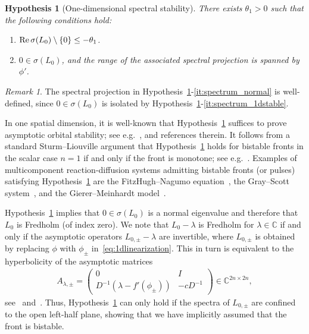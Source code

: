 \documentclass[12pt,oneside,a4paper,reqno]{amsart}
\numberwithin{equation}{section}
\newtheorem{hypothesis}{Hypothesis}
\theoremstyle{definition}
\theoremstyle{remark}
\newtheorem{remark}[theorem]{Remark}
\newcommand{\bbC}{{\mathbb C}}
\DeclareMathOperator{\Real}{Re}
\DeclarePairedDelimiter{\cur}{\{}{\}}
\begin{document}
\begin{hypothesis}[One-dimensional spectral stability]
    \label{hyp:spectrum_1d}
    There exists $\theta_1 > 0$ such that the following conditions hold:
	\begin{enumerate}[label=(\roman*)]
        \item \label{it:spectrum_1dstable} $\Real \sigma(L_0)\setminus \cur{0} \leq -\theta_1$.
        \item \label{it:spectrum_normal} $0 \in \sigma(L_0)$, and the range of the associated spectral projection is spanned by $\phi'$.
	\end{enumerate}
\end{hypothesis}
\begin{remark}
    The spectral projection in Hypothesis~\ref{hyp:spectrum_1d}-\ref{it:spectrum_normal} is well-defined, since $0 \in \sigma(L_0)$ is isolated by Hypothesis~\ref{hyp:spectrum_1d}-\ref{it:spectrum_1dstable}.
\end{remark}

In one spatial dimension, it is well-known that Hypothesis~\ref{hyp:spectrum_1d} suffices to prove asymptotic orbital stability; see e.g.~\cite{Henry_geometric_1981,Kapitula_spectral_2013,Sattinger_stability_1976}, and references therein. It follows from a standard Sturm--Liouville argument that Hypothesis~\ref{hyp:spectrum_1d} holds for bistable fronts in the scalar case $n=1$ if and only if the front is monotone; see e.g.~\cite[Chapter~2]{Kapitula_spectral_2013}. Examples of multicomponent reaction-diffusion systems admitting bistable fronts (or pulses) satisfying Hypothesis~\ref{hyp:spectrum_1d} are the FitzHugh--Nagumo equation~\cite{cornwell_existence_2018}, the Gray--Scott system~\cite{doelman_stability_2002}, and the Gierer--Meinhardt model~\cite{doelman_large_2001}.

Hypothesis~\ref{hyp:spectrum_1d} implies that $0 \in \sigma(L_0)$ is a normal eigenvalue and therefore that $L_0$ is Fredholm (of index zero).
We note that $L_0 - \lambda$ is Fredholm for $\lambda \in \bbC$ if and only if the asymptotic operators $L_{0,\pm} - \lambda$ are invertible, where $L_{0,\pm}$ is obtained by replacing $\phi$ with $\phi_{\pm}$ in~\eqref{eq:1dlinearization}.
This in turn is equivalent to the hyperbolicity of the asymptotic matrices
\begin{align*}
    A_{\lambda,\pm} = \begin{pmatrix} 0 & I \\ D^{-1} \left(\lambda - f'(\phi_\pm)\right) & -c D^{-1}\end{pmatrix} \in \bbC^{2n \times 2n},
\end{align*}
see~\cite[Chapter~2]{Kapitula_spectral_2013} and~\cite[\S\,3]{Sandstede_stability_2002}. 
Thus, Hypothesis~\ref{hyp:spectrum_1d} can only hold if the spectra of $L_{0,\pm}$ are confined to the open left-half plane, showing that we have implicitly assumed that the front is bistable.
\end{document}
